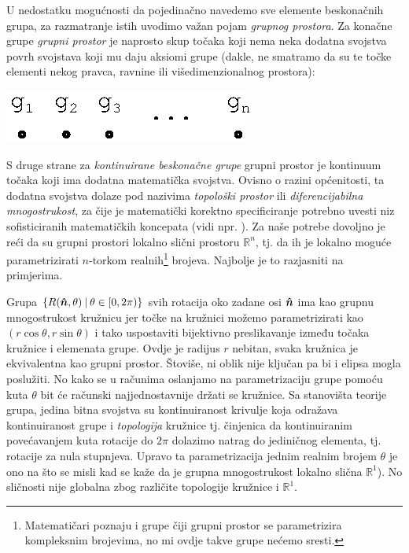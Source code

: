 U nedostatku mogućnosti da pojedinačno navedemo sve elemente beskonačnih
grupa, za razmatranje istih uvodimo važan pojam \emph{grupnog prostora}.
Za konačne grupe \emph{grupni prostor} je naprosto skup točaka koji
nema neka dodatna svojstva povrh svojstava koji mu daju aksiomi grupe
(dakle, ne smatramo da su te točke elementi nekog pravca, ravnine
ili višedimenzionalnog prostora):

\centerline{\includegraphics[scale=1.0]{pics/grupni_prostor.eps}}

S druge strane za \emph{kontinuirane beskonačne grupe} grupni prostor je
kontinuum točaka koji ima dodatna matematička svojstva. 
Ovisno o razini općenitosti, ta dodatna svojstva dolaze pod
nazivima \emph{topološki prostor} ili \emph{diferencijabilna mnogostrukost},
za čije je matematički korektno specificiranje potrebno uvesti
niz sofisticiranih matematičkih koncepata (vidi npr. 
\cite{Smolic:2024}). Za naše potrebe dovoljno je reći da su grupni
prostori lokalno slični prostoru $\mathbb{R}^n$,
tj. da ih je lokalno moguće parametrizirati $n$-torkom realnih\footnote{Matematičari
    poznaju i grupe čiji grupni prostor se parametrizira kompleksnim
    brojevima, no mi ovdje takve grupe nećemo sresti.}
brojeva. Najbolje je to razjasniti na primjerima.


Grupa $\{R(\unitn, \theta) \td \theta\in[0,2\pi)\}$ svih rotacija oko zadane osi
$\unitn$ ima kao grupnu mnogostrukost kružnicu jer točke na kružnici možemo parametrizirati
kao $(r\cos\theta, r\sin\theta)$ i tako uspostaviti bijektivno preslikavanje
između točaka kružnice i elemenata grupe. 
Ovdje je radijus $r$ nebitan, svaka kružnica je ekvivalentna kao
grupni prostor. Štoviše, ni oblik nije ključan pa bi i elipsa mogla poslužiti.
No kako se u računima oslanjamo na parametrizaciju grupe pomoću
kuta $\theta$ bit će računski najjednostavnije držati se kružnice.
Sa stanovišta teorije grupa, jedina bitna svojstva su kontinuiranost krivulje
koja odražava kontinuiranost grupe i \emph{topologija} kružnice tj. činjenica da 
kontinuiranim povećavanjem kuta rotacije do $2\pi$ dolazimo natrag do jediničnog
elementa, tj. rotacije za nula stupnjeva.
Upravo ta parametrizacija jednim realnim brojem $\theta$ je ono na što
se misli kad se kaže da je grupna mnogostrukost lokalno slična $\mathbb{R}^1$).
No sličnosti nije globalna zbog različite topologije kružnice
i $\mathbb{R}^1$.

